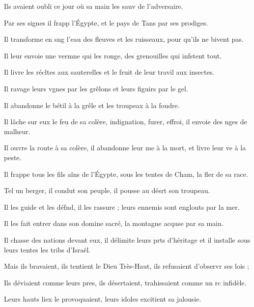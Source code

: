 \item Ils avaient oubli ce jour\psstar{} où sa main les sauv de l’adversaire.
\item Par ses signes il frapp l’Égypte,\psstar{} et le pays de Tans par ses prodiges.
\item Il transforme en sng l’eau des fleuves\psstar{} et les ruisseaux, pour qu’ils ne bivent pas.
\item Il leur envoie une vermne qui les ronge,\psstar{} des grenouilles qui infstent tout.
\item Il livre les récltes aux sauterelles\psstar{} et le fruit de leur travil aux insectes.
\item Il ravage leurs vgnes par les grêlons\psstar{} et leurs figuirs par le gel.
\item Il abandonne le bétil à la grêle\psstar{} et les troupeax à la foudre.
\item Il lâche sur eux le feu de sa colère,\pscross{} indignation, furer, effroi,\psstar{} il envoie des nges de malheur.
\item Il ouvre la route à sa colère,\pscross{} il abandonne leur me à la mort,\psstar{} et livre leur ve à la peste.
\item Il frappe tous les fils aîns de l’Égypte,\psstar{} sous les tentes de Cham, la fler de sa race.
\item Tel un berger, il condut son peuple,\psstar{} il pousse au désrt son troupeau.
\item Il les guide et les défnd, il les rassure ;\psstar{} leurs ennemis sont englouts par la mer.
\item Il les fait entrer dans son domine sacré,\psstar{} la montagne acquse par sa main.
\item Il chasse des nations devant eux,\pscross{} il délimite leurs prts d’héritage\psstar{} et il installe sous leurs tentes les tribs d’Israël.
\item Mais ils bravaient, ils tentient le Dieu Très-Haut,\psstar{} ils refusaient d’observr ses lois ;
\item Ils déviaient comme leurs pres, ils désertaient,\psstar{} trahissaient comme un rc infidèle.
\item Leurs hauts liex le provoquaient,\psstar{} leurs idoles excitient sa jalousie.
